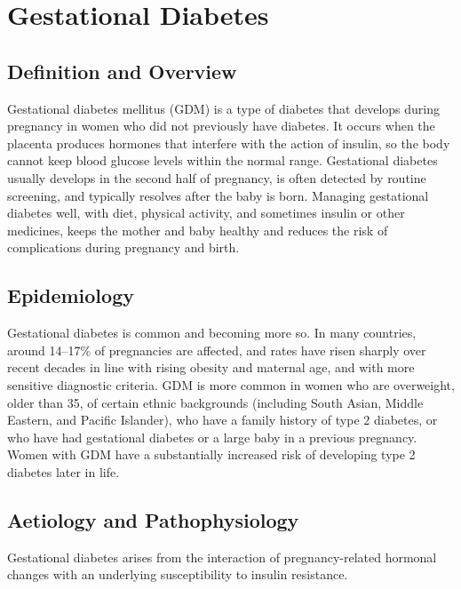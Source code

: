 \chapter{Gestational Diabetes}

\section*{Definition and Overview}
Gestational diabetes mellitus (GDM) is a type of diabetes that develops during pregnancy in women who did not previously have diabetes. It occurs when the placenta produces hormones that interfere with the action of insulin, so the body cannot keep blood glucose levels within the normal range. Gestational diabetes usually develops in the second half of pregnancy, is often detected by routine screening, and typically resolves after the baby is born. Managing gestational diabetes well, with diet, physical activity, and sometimes insulin or other medicines, keeps the mother and baby healthy and reduces the risk of complications during pregnancy and birth.

\section*{Epidemiology}
Gestational diabetes is common and becoming more so. In many countries, around 14--17\% of pregnancies are affected, and rates have risen sharply over recent decades in line with rising obesity and maternal age, and with more sensitive diagnostic criteria. GDM is more common in women who are overweight, older than 35, of certain ethnic backgrounds (including South Asian, Middle Eastern, and Pacific Islander), who have a family history of type 2 diabetes, or who have had gestational diabetes or a large baby in a previous pregnancy. Women with GDM have a substantially increased risk of developing type 2 diabetes later in life.

\section*{Aetiology and Pathophysiology}
Gestational diabetes arises from the interaction of pregnancy-related hormonal changes with an underlying susceptibility to insulin resistance.

